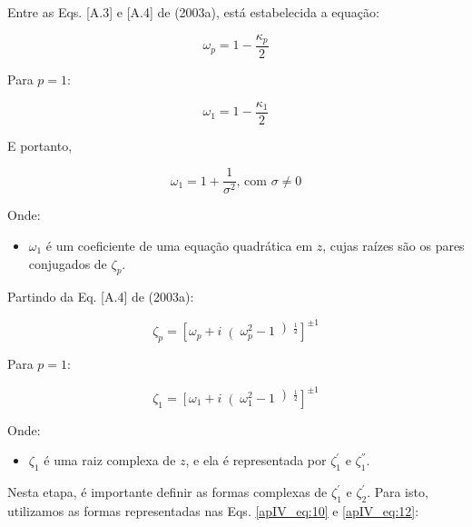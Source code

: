 Entre as Eqs. [A.3] e [A.4] de  (2003a), está estabelecida a equação:

\begin{equation}
\label{apIV_eq:8}
\omega_{p} = 1 - \frac{\kappa_{p}}{2}
\end{equation}

Para $p = 1$:

\begin{equation}
\label{apIV_eq:9}
\omega_{1} = 1 - \frac{\kappa_{1}}{2}
\end{equation}

E portanto,

\begin{equation}
\label{apIV_eq:10}
\omega_{1} = 1 + \frac{1}{\sigma^{2}} \text{, com $\sigma \neq 0$}
\end{equation}

Onde:

\begin{itemize}
	\item $\omega_{1}$ é um coeficiente de uma equação quadrática em $z$, cujas raízes são os pares conjugados de $\zeta_{p}$.
\end{itemize}

Partindo da Eq. [A.4] de  (2003a):

\begin{equation}
\label{apIV_eq:11}
\zeta_{p} = \left[\omega_{p} + i\right(\omega_{p}^{2} - 1\left)^{\frac{1}{2}}\right]^{\pm 1}
\end{equation}

Para $p = 1$:

\begin{equation}
\label{apIV_eq:12}
\zeta_{1} = \left[\omega_{1} + i\right(\omega_{1}^{2} - 1\left)^{\frac{1}{2}}\right]^{\pm 1}
\end{equation}

Onde:

\begin{itemize}
	\item $\zeta_{1}$ é uma raiz complexa de $z$, e ela é representada por $\zeta_{1}^{'}$ e $\zeta_{1}^{''}$.
\end{itemize}

Nesta etapa, é importante definir as formas complexas de $\zeta_{1}^{'}$ e $\zeta_{2}^{'}$. Para isto, utilizamos as formas representadas nas Eqs. \ref{apIV_eq:10} e \ref{apIV_eq:12}:


